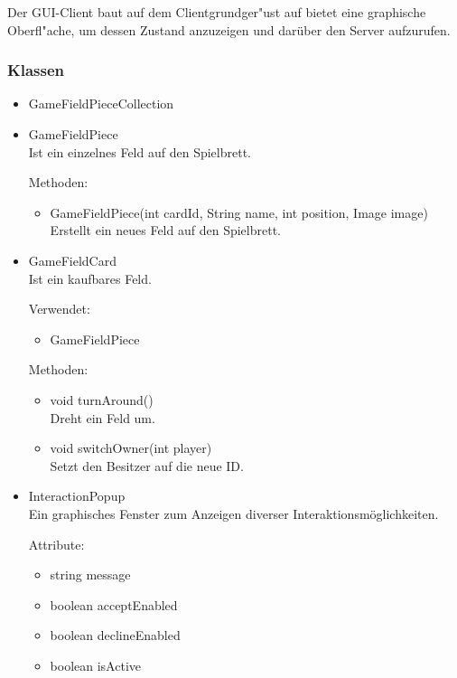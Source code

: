 \documentclass[a4paper,10pt]{article}
\begin{document}
Der GUI-Client baut auf dem Clientgrundger"ust auf bietet eine graphische Oberfl"ache, um dessen Zustand anzuzeigen und darüber den Server aufzurufen.

\subsubsection{Klassen}

\begin{itemize}
\item GameFieldPieceCollection\\

\item GameFieldPiece\\
Ist ein einzelnes Feld auf den Spielbrett.

Methoden:
\begin{itemize}
\item GameFieldPiece(int cardId, String name, int position, Image image)
Erstellt ein neues Feld auf den Spielbrett.
\end{itemize}

\item GameFieldCard \\
Ist ein kaufbares Feld.

Verwendet:
\begin{itemize}
\item GameFieldPiece
\end{itemize}

Methoden:
\begin{itemize}
\item void turnAround() \\
Dreht ein Feld um.
\item void switchOwner(int player) \\
Setzt den Besitzer auf die neue ID.
\end{itemize}

\item InteractionPopup \\
Ein graphisches Fenster zum Anzeigen diverser Interaktionsmöglichkeiten.

Attribute:
\begin{itemize}
\item string message
\item boolean acceptEnabled
\item boolean declineEnabled
\item boolean isActive
\end{itemize}


\end{itemize}
\end{document}
